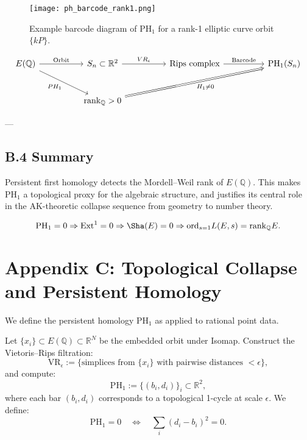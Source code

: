 \begin{figure}[h]
  \centering
  \texttt{[image: ph\_barcode\_rank1.png]}
  \caption{Example barcode diagram of \( \mathrm{PH}_1 \) for a rank-1 elliptic curve orbit \( \{kP\} \).}
\end{figure}

\[
\begin{tikzcd}[row sep=large, column sep=huge]
E(\mathbb{Q}) \arrow[r, "\text{Orbit}"] \arrow[dr, swap, "PH_1"] & 
S_n \subset \mathbb{R}^2 \arrow[r, "VR_\epsilon"] &
\text{Rips complex} \arrow[r, "\text{Barcode}"] &
\mathrm{PH}_1(S_n) \\
& \mathrm{rank}_{\mathbb{Q}} > 0 \arrow[urr, Rightarrow, swap, "H_1 \neq 0"]
\end{tikzcd}
\]

---

\subsection*{B.4 Summary}

Persistent first homology detects the Mordell--Weil rank of \( E(\mathbb{Q}) \).  
This makes \( \mathrm{PH}_1 \) a topological proxy for the algebraic structure, and justifies its central role  
in the AK-theoretic collapse sequence from geometry to number theory.

\[
\mathrm{PH}_1 = 0 \Rightarrow \mathrm{Ext}^1 = 0 \Rightarrow \Sha(E) = 0 \Rightarrow \mathrm{ord}_{s=1}L(E,s) = \mathrm{rank}_{\mathbb{Q}}E.
\]



\section*{Appendix C: Topological Collapse and Persistent Homology}

We define the persistent homology \( \mathrm{PH}_1 \) as applied to rational point data.

Let \( \{x_i\} \subset E(\mathbb{Q}) \subset \mathbb{R}^N \) be the embedded orbit under Isomap.  
Construct the Vietoris–Rips filtration:
\[
\mathrm{VR}_\epsilon := \{ \text{simplices from } \{x_i\} \text{ with pairwise distances } < \epsilon \},
\]
and compute:
\[
\mathrm{PH}_1 := \{ (b_i, d_i) \}_{i} \subset \mathbb{R}^2,
\]
where each bar \( (b_i, d_i) \) corresponds to a topological 1-cycle at scale \( \epsilon \).  
We define:
\[
\mathrm{PH}_1 = 0 \quad \Leftrightarrow \quad \sum_i (d_i - b_i)^2 = 0.
\]

